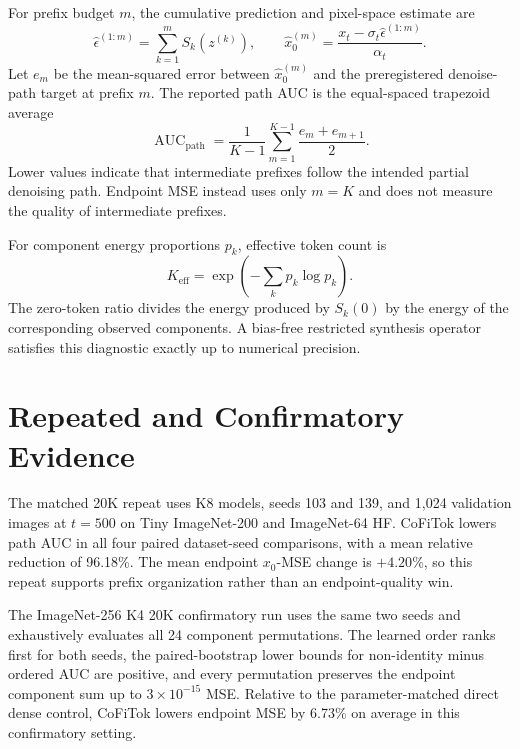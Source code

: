 \documentclass[letterpaper]{article}
\newcommand{\method}{CoFiTok}
\newcommand{\epshat}{\hat{\epsilon}}
\begin{document}
For prefix budget $m$, the cumulative prediction and pixel-space estimate are
\begin{equation}
  \epshat^{(1:m)}=\sum_{k=1}^{m}S_k(z^{(k)}), \qquad
  \hat{x}_0^{(m)}=\frac{x_t-\sigma_t\epshat^{(1:m)}}{\alpha_t}.
\end{equation}
Let $e_m$ be the mean-squared error between $\hat{x}_0^{(m)}$ and the
preregistered denoise-path target at prefix $m$. The reported path AUC is the
equal-spaced trapezoid average
\begin{equation}
  \operatorname{AUC}_{\mathrm{path}}
  =\frac{1}{K-1}\sum_{m=1}^{K-1}\frac{e_m+e_{m+1}}{2}.
\end{equation}
Lower values indicate that intermediate prefixes follow the intended partial
denoising path. Endpoint MSE instead uses only $m=K$ and does not measure the
quality of intermediate prefixes.

For component energy proportions $p_k$, effective token count is
\begin{equation}
  K_{\mathrm{eff}}=\exp\!\left(-\sum_k p_k\log p_k\right).
\end{equation}
The zero-token ratio divides the energy produced by $S_k(0)$ by the energy of
the corresponding observed components. A bias-free restricted synthesis
operator satisfies this diagnostic exactly up to numerical precision.

\section{Repeated and Confirmatory Evidence}

The matched 20K repeat uses K8 models, seeds 103 and 139, and 1,024 validation
images at $t=500$ on Tiny ImageNet-200 and ImageNet-64 HF. \method{} lowers path
AUC in all four paired dataset-seed comparisons, with a mean relative reduction
of 96.18\%. The mean endpoint $x_0$-MSE change is $+4.20\%$, so this repeat
supports prefix organization rather than an endpoint-quality win.

The ImageNet-256 K4 20K confirmatory run uses the same two seeds and exhaustively
evaluates all 24 component permutations. The learned order ranks first for both
seeds, the paired-bootstrap lower bounds for non-identity minus ordered AUC are
positive, and every permutation preserves the endpoint component sum up to
$3\times10^{-15}$ MSE. Relative to the parameter-matched direct dense control,
\method{} lowers endpoint MSE by 6.73\% on average in this confirmatory setting.
\end{document}
